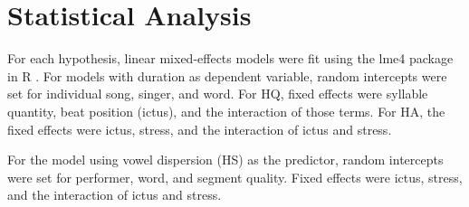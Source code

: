 \section{Statistical Analysis} 
For each hypothesis, linear mixed-effects models were fit using the lme4 package in R \citep{lme4,r2022}. For models with duration as dependent variable, random intercepts were set for individual song, singer, and word. For HQ, fixed effects were syllable quantity, beat position (ictus), and the interaction of those terms. For HA, the fixed effects were ictus, stress, and the interaction of ictus and stress. 

For the model using vowel dispersion (HS) as the predictor, random intercepts were set for performer, word, and segment quality. Fixed effects were ictus, stress, and the interaction of ictus and stress. 
